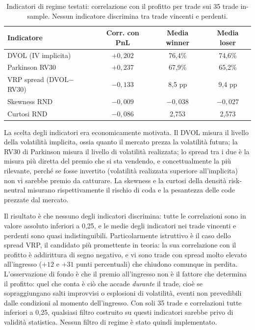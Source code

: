 \begin{table}[H]
\centering
\caption{Indicatori di regime testati: correlazione con il profitto per
trade sui 35 trade in-sample. Nessun indicatore discrimina tra trade
vincenti e perdenti.}
\label{tab:regime-indicatori}
\begin{tabular}{lccc}
\toprule
\textbf{Indicatore} & \textbf{Corr. con PnL} & \textbf{Media winner} & \textbf{Media loser} \\
\midrule
DVOL (IV implicita)        & $+0{,}202$ & 76,4\%   & 74,6\% \\
Parkinson RV30             & $+0{,}237$ & 67,9\%   & 65,2\% \\
VRP spread (DVOL$-$RV30)   & $-0{,}133$ & 8,5 pp   & 9,4 pp \\
Skewness RND               & $-0{,}009$ & $-0{,}038$ & $-0{,}027$ \\
Curtosi RND                & $-0{,}086$ & 2,753    & 2,573 \\
\bottomrule
\end{tabular}
\end{table}

La scelta degli indicatori era economicamente motivata. Il DVOL misura il
livello della volatilità implicita, ossia quanto il mercato prezza la
volatilità futura; la RV30 di Parkinson misura il livello di volatilità
realizzata; lo spread tra i due è la misura più diretta del premio che si
sta vendendo, e concettualmente la più rilevante, perché se fosse invertito
(volatilità realizzata superiore all'implicita) non vi sarebbe premio da
catturare. La skewness e la curtosi della densità risk-neutral misurano
rispettivamente il rischio di coda e la pesantezza delle code prezzate dal
mercato.

Il risultato è che nessuno degli indicatori discrimina: tutte le
correlazioni sono in valore assoluto inferiori a 0,25, e le medie degli
indicatori nei trade vincenti e perdenti sono quasi indistinguibili.
Particolarmente istruttivo è il caso dello spread VRP, il candidato più
promettente in teoria: la sua correlazione con il profitto è addirittura di
segno negativo, e vi sono trade con spread molto elevato all'ingresso ($+12$
e $+31$ punti percentuali) che chiudono comunque in perdita. L'osservazione
di fondo è che il premio all'ingresso non è il fattore che determina il
profitto: quel che conta è ciò che accade \emph{durante} il trade, cioè se
sopraggiungano salti improvvisi o esplosioni di volatilità, eventi non
prevedibili dalle condizioni al momento dell'ingresso. Con soli 35 trade e
correlazioni tutte inferiori a 0,25, qualsiasi filtro costruito su questi
indicatori sarebbe privo di validità statistica. Nessun filtro di regime è
stato quindi implementato.

